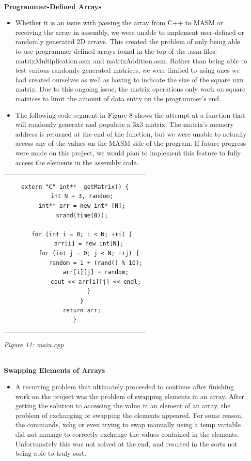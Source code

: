 \documentclass[twoside]{article}
\begin{document}
\noindent \\ \textbf{Programmer-Defined Arrays}
\begin{itemize}
\item Whether it is an issue with passing the array from C++ to MASM or receiving the array in assembly, we were unable to implement user-defined or randomly generated 2D arrays. This created the problem of only being able to use programmer-defined arrays found in the top of the .asm files: matrixMultiplication.asm and matrixAddition.asm. Rather than being able to test various randomly generated matrices, we were limited to using ones we had created ourselves as well as having to indicate the size of the square nxn matrix. Due to this ongoing issue, the matrix operations only work on square matrices to limit the amount of data entry on the programmer’s end.
\item The following code segment in Figure 8 shows the attempt at a function that will randomly generate and populate a 3x3 matrix. The matrix’s memory address is returned at the end of the function, but we were unable to actually access any of the values on the MASM side of the program. If future progress were made on this project, we would plan to implement this feature to fully access the elements in the assembly code.
\end{itemize}
\begin{center} \begin{tabular}{c} \begin{lstlisting}
extern "C" int** _getMatrix() {
	int N = 3, random;
	int** arr = new int* [N];
	srand(time(0));

	for (int i = 0; i < N; ++i) {
		arr[i] = new int[N];
		for (int j = 0; j < N; ++j) {
			random = 1 + (rand() % 10);
			arr[i][j] = random;
			cout << arr[i][j] << endl;
		}
	}
	return arr;
}
\end{lstlisting} \end{tabular} \end{center}
\begin{center}\textit{Figure 11: main.cpp}\end{center}

\noindent \\ \textbf{Swapping Elements of Arrays} 
\begin{itemize}
\item A recurring problem that ultimately proceeded to continue after finishing work on the project was the problem of swapping elements in an array. After getting the solution to accessing the value in an element of an array, the problem of exchanging or swapping the elements appeared. For some reason, the commands, xchg or even trying to swap manually using a temp variable did not manage to correctly exchange the values contained in the elements.  Unfortunately this was not solved at the end, and resulted in the sorts not being able to truly sort. 
\end{itemize}
\end{document}
